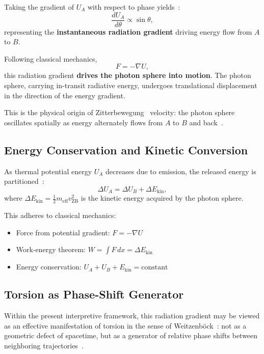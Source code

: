 \documentclass[12pt,letterpaper]{article}
\begin{document}
Taking the gradient of $U_A$ with respect to phase yields~\cite{hanamura18356895}:
\begin{equation}
\frac{dU_A}{d\theta} \propto \sin\theta,
\end{equation}
representing the \textbf{instantaneous radiation gradient} driving energy flow from $A$ to $B$.

Following classical mechanics,
\begin{equation}
F = -\nabla U,
\end{equation}
this radiation gradient \textbf{drives the photon sphere into motion}. The photon sphere, carrying in-transit radiative energy, undergoes translational displacement in the direction of the energy gradient.

This is the physical origin of Zitterbewegung~\cite{Schrodinger1930} velocity: the photon sphere oscillates spatially as energy alternately flows from $A$ to $B$ and back~\cite{hanamura18356895}.

\subsection{Energy Conservation and Kinetic Conversion}

As thermal potential energy $U_A$ decreases due to emission, the released energy is partitioned~\cite{hanamura17765017}:
\begin{equation}
\Delta U_A = \Delta U_B + \Delta E_{\mathrm{kin}},
\end{equation}
where $\Delta E_{\mathrm{kin}} = \frac{1}{2} m_{\mathrm{eff}} v_{\mathrm{ZB}}^2$ is the kinetic energy acquired by the photon sphere.

This adheres to classical mechanics:
\begin{itemize}
\item Force from potential gradient: $F = -\nabla U$
\item Work-energy theorem: $W = \int F \, dx = \Delta E_{\mathrm{kin}}$
\item Energy conservation: $U_A + U_B + E_{\mathrm{kin}} = \text{constant}$
\end{itemize}

\subsection{Torsion as Phase-Shift Generator}

Within the present interpretive framework, this radiation gradient may be viewed as an effective manifestation of torsion in the sense of Weitzenb\"{o}ck~\cite{Weitzenbock1923,Aldrovandi2013}: not as a geometric defect of spacetime, but as a generator of relative phase shifts between neighboring trajectories~\cite{hanamura18135855}.
\end{document}
